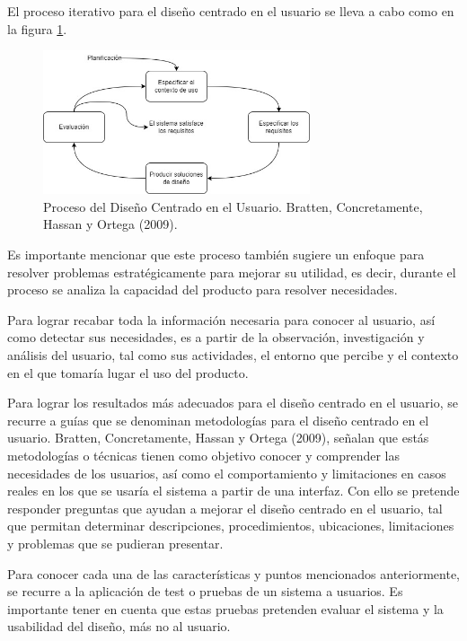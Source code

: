 El proceso iterativo para el diseño centrado en el usuario se lleva a cabo como en la figura \ref{fig:33}.

\begin{figure}[H]
  \centering
  \includegraphics[width=0.70\textwidth]{Cap3/Figuras/DCU.jpg}
  \caption{Proceso del Diseño Centrado en el Usuario. Bratten, Concretamente, Hassan y Ortega (2009).}
  \label{fig:33}
\end{figure}

Es importante mencionar que este proceso también sugiere un enfoque para resolver problemas estratégicamente para mejorar su utilidad, es decir, durante el proceso se analiza la capacidad del producto para resolver necesidades.

Para lograr recabar toda la información necesaria para conocer al usuario, así como detectar sus necesidades, es a partir de la observación, investigación y análisis del usuario, tal como sus actividades, el entorno que percibe y el contexto en el que tomaría lugar el uso del producto.

Para lograr los resultados más adecuados para el diseño centrado en el usuario, se recurre a guías que se denominan metodologías para el diseño centrado en el usuario. Bratten, Concretamente, Hassan y Ortega (2009), señalan que estás metodologías o técnicas tienen como objetivo conocer y comprender las necesidades de los usuarios, así como el comportamiento y limitaciones en casos reales en los que se usaría el sistema a partir de una interfaz. Con ello se pretende responder preguntas que ayudan a mejorar el diseño centrado en el usuario, tal que permitan determinar descripciones, procedimientos, ubicaciones, limitaciones y problemas que se pudieran presentar.

Para conocer cada una de las características y puntos mencionados anteriormente, se recurre a la aplicación de test o pruebas de un sistema a usuarios. Es importante tener en cuenta que estas pruebas pretenden evaluar el sistema y la usabilidad del diseño, más no al usuario.

